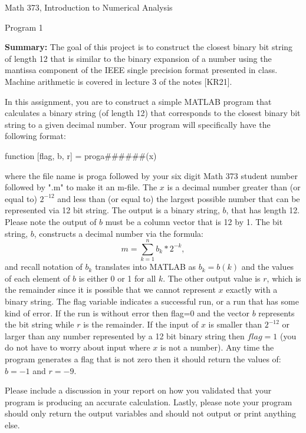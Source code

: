 \documentclass{article}
\renewcommand{\cite}[1]{[#1]}
\def\ds{\displaystyle}
\begin{document}

\large

{\Large Math 373, Introduction to Numerical Analysis}


{\Large Program 1} \par \medskip \noindent
%
{\bf Summary:} The goal of this project is to construct the closest binary bit string of length 12 that is similar to the binary expansion of a number using the mantissa component of the IEEE single precision format presented in class.  Machine arithmetic is covered in lecture 3 of the notes \cite{KR21}. 
\par \bigskip \par \noindent
In this assignment, you are to construct a simple MATLAB program that calculates a binary string (of length 12) that corresponds to the closest binary bit string to a given decimal number. Your program will specifically have the following format: \par \medskip
function [flag, b, r] = proga\#\#\#\#\#\#(x) \par \medskip \noindent
%
where the file name is proga followed by your six digit Math 373 student number  followed by ".m" to make it an m-file. The $x$ is a decimal number greater than (or equal to) $\ds 2^{-12}$ and less than (or equal to) the largest possible number that can be represented via 12 bit string. The output is a binary string, $b$, that has length 12. Please note the output of $b$ must be a column vector that is 12 by 1. The bit string, $b$, constructs a decimal number via the formula:
$$m = \sum_{k=1}^n b_k*2^{-k},$$ and recall notation of $\ds b_k$ translates into MATLAB as $\ds b_k = b(k)$ and the values of each element of $b$ is either 0 or 1 for all $k$. The other output value is $r$, which is the remainder since it is possible that we cannot represent $x$ exactly with a binary string. The flag variable indicates a successful run, or a run that has some kind of error. If the run is without error then flag=0 and the vector $b$ represents the bit string while $r$ is the remainder. If the input of $x$ is smaller than $\ds 2^{-12}$ or larger than any number represented by a 12 bit binary string then $flag = 1$ (you do not have to worry about input where $x$ is not a number).  Any time the program generates a flag that is not zero then it should return the values of: $b=-1$ and $r= -9$. 

Please include a discussion in your report on how you validated that your program is producing an accurate calculation. Lastly, please note your program should only return the output variables and should not output or print anything else. 
\end{document}
